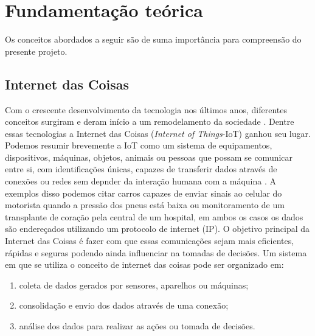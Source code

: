 \documentclass[../../layout.tex]{subfiles}
\begin{document}
\chapter{Fundamentação teórica}
\hspace*{3em}Os conceitos abordados a seguir são de suma importância para compreensão do presente projeto.

\section{Internet das Coisas}
\hspace*{3em}Com o crescente desenvolvimento da tecnologia nos últimos anos, diferentes conceitos surgiram e deram início a um remodelamento da sociedade . Dentre essas tecnologias a Internet das Coisas (\emph{Internet of Things}-IoT) ganhou seu lugar. Podemos resumir brevemente a IoT como um sistema de equipamentos, dispositivos, máquinas, objetos, animais ou pessoas que possam se comunicar entre si, com identificações únicas, capazes de transferir dados através de conexões ou redes sem depnder da interação humana com a máquina \cite{iot}. A exemplos disso podemos citar carros capazes de enviar sinais ao celular do motorista quando a pressão dos pneus está baixa ou monitoramento de um transplante de coração pela central de um hospital, em ambos os casos os dados são endereçados utilizando um protocolo de internet (IP). O objetivo principal da Internet das Coisas é fazer com que essas comunicações sejam mais eficientes, rápidas e seguras podendo ainda influenciar na tomadas de decisões. Um sistema em que se utiliza o conceito de internet das coisas pode ser organizado em:
\begin{enumerate}[label=\alph*)]
\itemsep0em
\item coleta de dados gerados por sensores, aparelhos ou máquinas;
\item consolidação e envio dos dados através de uma conexão;
\item análise dos dados para realizar as ações ou tomada de decisões.
\end{enumerate}
\end{document}
